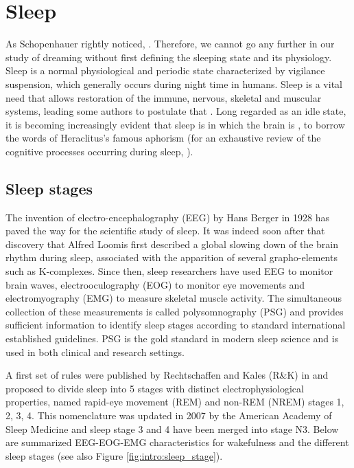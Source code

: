 \section{Sleep}
\label{sec:dream-research:sleep}

As Schopenhauer rightly noticed, . Therefore, we cannot go any further in our study of dreaming without first defining the sleeping state and its physiology. Sleep is a normal physiological and periodic state characterized by vigilance suspension, which generally occurs during night time in humans. Sleep is a vital need that allows restoration of the immune, nervous, skeletal and muscular systems, leading some authors to postulate that  \citep{tononi_sleep_2014}. Long regarded as an idle state, it is becoming increasingly evident that sleep is  \citep{hirshkowitz_normal_2004} in which the brain is , to borrow the words of Heraclitus’s famous aphorism (for an exhaustive review of the cognitive processes occurring during sleep, \citealt[see][]{andrillon_sleeping_2016}).

\subsection{Sleep stages}
\label{sec:dream-research:sleep:stages}

The invention of electro-encephalography (EEG) by Hans Berger in 1928 has paved the way for the scientific study of sleep. It was indeed soon after that discovery that Alfred Loomis first described a global slowing down of the brain rhythm during sleep, associated with the apparition of several grapho-elements such as K-complexes. Since then, sleep researchers have used EEG to monitor brain waves, electrooculography (EOG) to monitor eye movements and electromyography (EMG) to measure skeletal muscle activity. The simultaneous collection of these measurements is called polysomnography (PSG) and provides sufficient information to identify sleep stages according to standard international established guidelines. PSG is the gold standard in modern sleep science and is used in both clinical and research settings.

A first set of rules were published by Rechtschaffen and Kales (R\&K) in \citeyear{kales_manual_1968} and proposed to divide sleep into 5 stages with distinct electrophysiological properties, named rapid-eye movement (REM) and non-REM (NREM) stages 1, 2, 3, 4. This nomenclature was updated in 2007 by the American Academy of Sleep Medicine \citep{iber_aasm_2007} and sleep stage 3 and 4 have been merged into stage N3. Below are summarized EEG-EOG-EMG characteristics for wakefulness and the different sleep stages (see also Figure \ref{fig:intro:sleep_stage}).

